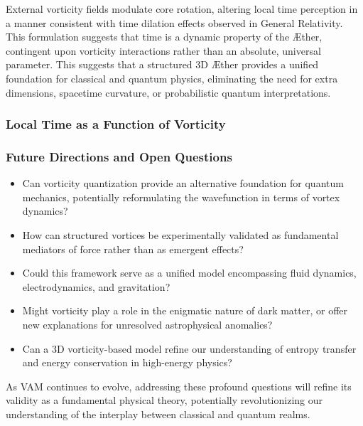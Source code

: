 External vorticity fields modulate core rotation, altering local time perception in a manner consistent with time dilation effects observed in General Relativity.
This formulation suggests that time is a dynamic property of the Æther, contingent upon vorticity interactions rather than an absolute, universal parameter.
    This suggests that a structured 3D Æther provides a unified foundation for classical and quantum physics, eliminating the need for extra dimensions, spacetime curvature, or probabilistic quantum interpretations.

\subsubsection*{Local Time as a Function of Vorticity}\label{subsubsec:local-time-as-a-function-of-vorticity}



\subsubsection*{Future Directions and Open Questions}
\begin{itemize}
    \item Can vorticity quantization provide an alternative foundation for quantum mechanics, potentially reformulating the wavefunction in terms of vortex dynamics?
    \item How can structured vortices be experimentally validated as fundamental mediators of force rather than as emergent effects?
    \item Could this framework serve as a unified model encompassing fluid dynamics, electrodynamics, and gravitation?
    \item Might vorticity play a role in the enigmatic nature of dark matter, or offer new explanations for unresolved astrophysical anomalies?
    \item Can a 3D vorticity-based model refine our understanding of entropy transfer and energy conservation in high-energy physics?
\end{itemize}

As VAM continues to evolve, addressing these profound questions will refine its validity as a fundamental physical theory, potentially revolutionizing our understanding of the interplay between classical and quantum realms.